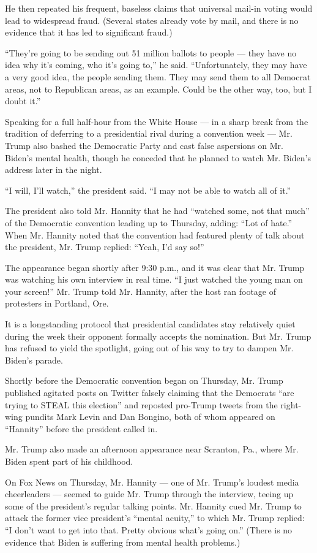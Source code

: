 He then repeated his frequent, baseless claims that universal mail-in
voting would lead to widespread fraud. (Several states already vote by
mail, and there is no evidence that it has led to significant fraud.)

``They're going to be sending out 51 million ballots to people --- they
have no idea why it's coming, who it's going to,'' he said.
``Unfortunately, they may have a very good idea, the people sending
them. They may send them to all Democrat areas, not to Republican areas,
as an example. Could be the other way, too, but I doubt it.''

Speaking for a full half-hour from the White House --- in a sharp break
from the tradition of deferring to a presidential rival during a
convention week --- Mr. Trump also bashed the Democratic Party and cast
false aspersions on Mr. Biden's mental health, though he conceded that
he planned to watch Mr. Biden's address later in the night.

``I will, I'll watch,'' the president said. ``I may not be able to watch
all of it.''

The president also told Mr. Hannity that he had ``watched some, not that
much'' of the Democratic convention leading up to Thursday, adding:
``Lot of hate.'' When Mr. Hannity noted that the convention had featured
plenty of talk about the president, Mr. Trump replied: ``Yeah, I'd say
so!''

The appearance began shortly after 9:30 p.m., and it was clear that Mr.
Trump was watching his own interview in real time. ``I just watched the
young man on your screen!'' Mr. Trump told Mr. Hannity, after the host
ran footage of protesters in Portland, Ore.

It is a longstanding protocol that presidential candidates stay
relatively quiet during the week their opponent formally accepts the
nomination. But Mr. Trump has refused to yield the spotlight, going out
of his way to try to dampen Mr. Biden's parade.

Shortly before the Democratic convention began on Thursday, Mr. Trump
published agitated posts on Twitter falsely claiming that the Democrats
``are trying to STEAL this election'' and reposted pro-Trump tweets from
the right-wing pundits Mark Levin and Dan Bongino, both of whom appeared
on ``Hannity'' before the president called in.

Mr. Trump also made an afternoon appearance near Scranton, Pa., where
Mr. Biden spent part of his childhood.

On Fox News on Thursday, Mr. Hannity --- one of Mr. Trump's loudest
media cheerleaders --- seemed to guide Mr. Trump through the interview,
teeing up some of the president's regular talking points. Mr. Hannity
cued Mr. Trump to attack the former vice president's ``mental acuity,''
to which Mr. Trump replied: ``I don't want to get into that. Pretty
obvious what's going on.'' (There is no evidence that Biden is suffering
from mental health problems.)

